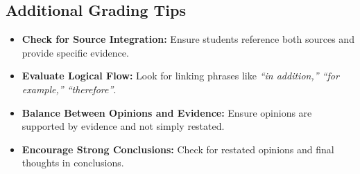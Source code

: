 \documentclass[12pt]{article}
\begin{document}
\subsection*{Additional Grading Tips}
\begin{tcolorbox}[colframe=black!40, colback=gray!5]
\begin{itemize}
    \item \textbf{Check for Source Integration:} Ensure students reference both sources and provide specific evidence.
    \item \textbf{Evaluate Logical Flow:} Look for linking phrases like \textit{“in addition,” “for example,” “therefore”}.
    \item \textbf{Balance Between Opinions and Evidence:} Ensure opinions are supported by evidence and not simply restated.
    \item \textbf{Encourage Strong Conclusions:} Check for restated opinions and final thoughts in conclusions.
\end{itemize}
\end{tcolorbox}
\end{document}
